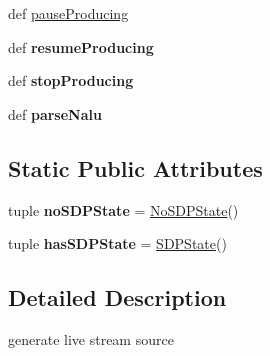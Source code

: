 \begin{DoxyCompactItemize}
\item 
def \hyperlink{classpython_1_1streamserver_1_1server_1_1source_1_1LiveSource_ad47941d73793e83d4a12e669c2d166b0}{pauseProducing}
\item 
\hypertarget{classpython_1_1streamserver_1_1server_1_1source_1_1LiveSource_a80e3fd39e5fd0027e69849a4afdc8905}{
def {\bfseries resumeProducing}}
\label{classpython_1_1streamserver_1_1server_1_1source_1_1LiveSource_a80e3fd39e5fd0027e69849a4afdc8905}

\item 
\hypertarget{classpython_1_1streamserver_1_1server_1_1source_1_1LiveSource_a9cc460c4ed10aefa69409f6e29020936}{
def {\bfseries stopProducing}}
\label{classpython_1_1streamserver_1_1server_1_1source_1_1LiveSource_a9cc460c4ed10aefa69409f6e29020936}

\item 
\hypertarget{classpython_1_1streamserver_1_1server_1_1source_1_1LiveSource_a4581b650fcb2d690571909ee5625e30d}{
def {\bfseries parseNalu}}
\label{classpython_1_1streamserver_1_1server_1_1source_1_1LiveSource_a4581b650fcb2d690571909ee5625e30d}

\end{DoxyCompactItemize}
\subsection*{Static Public Attributes}
\begin{DoxyCompactItemize}
\item 
\hypertarget{classpython_1_1streamserver_1_1server_1_1source_1_1LiveSource_a548a3c84d07ade1b6e147b3376ff75c2}{
tuple {\bfseries noSDPState} = \hyperlink{classpython_1_1streamserver_1_1server_1_1source_1_1NoSDPState}{NoSDPState}()}
\label{classpython_1_1streamserver_1_1server_1_1source_1_1LiveSource_a548a3c84d07ade1b6e147b3376ff75c2}

\item 
\hypertarget{classpython_1_1streamserver_1_1server_1_1source_1_1LiveSource_aa77a75961ae9e8fbfa7a6aa3cc4dd775}{
tuple {\bfseries hasSDPState} = \hyperlink{classpython_1_1streamserver_1_1server_1_1source_1_1SDPState}{SDPState}()}
\label{classpython_1_1streamserver_1_1server_1_1source_1_1LiveSource_aa77a75961ae9e8fbfa7a6aa3cc4dd775}

\end{DoxyCompactItemize}


\subsection{Detailed Description}
\begin{DoxyVerb}generate live stream source\end{DoxyVerb}
 

